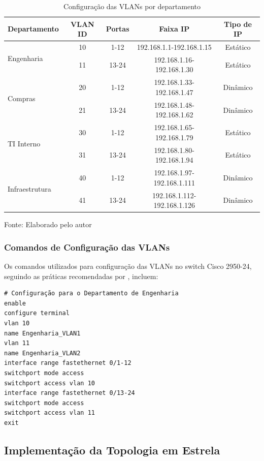 \begin{table}[H]
\centering
\caption{Configuração das VLANs por departamento}
\begin{tabular}{|l|c|c|c|c|}
\hline
\textbf{Departamento} & \textbf{VLAN ID} & \textbf{Portas} & \textbf{Faixa IP} & \textbf{Tipo de IP} \\
\hline
\multirow{2}{*}{Engenharia} & 10 & 1-12 & 192.168.1.1-192.168.1.15 & Estático \\
\cline{2-5}
& 11 & 13-24 & 192.168.1.16-192.168.1.30 & Estático \\
\hline
\multirow{2}{*}{Compras} & 20 & 1-12 & 192.168.1.33-192.168.1.47 & Dinâmico \\
\cline{2-5}
& 21 & 13-24 & 192.168.1.48-192.168.1.62 & Dinâmico \\
\hline
\multirow{2}{*}{TI Interno} & 30 & 1-12 & 192.168.1.65-192.168.1.79 & Estático \\
\cline{2-5}
& 31 & 13-24 & 192.168.1.80-192.168.1.94 & Estático \\
\hline
\multirow{2}{*}{Infraestrutura} & 40 & 1-12 & 192.168.1.97-192.168.1.111 & Dinâmico \\
\cline{2-5}
& 41 & 13-24 & 192.168.1.112-192.168.1.126 & Dinâmico \\
\hline
\end{tabular}

\label{tab:vlans_configuracao}
{\fontsize{10pt}{\baselineskip}\selectfont
Fonte: Elaborado pelo autor}
\end{table}

\subsubsection{Comandos de Configuração das VLANs}

Os comandos utilizados para configuração das VLANs no switch Cisco 2950-24, seguindo as práticas recomendadas por , incluem:

\begin{verbatim}
# Configuração para o Departamento de Engenharia
enable
configure terminal
vlan 10
name Engenharia_VLAN1
vlan 11
name Engenharia_VLAN2
interface range fastethernet 0/1-12
switchport mode access
switchport access vlan 10
interface range fastethernet 0/13-24
switchport mode access
switchport access vlan 11
exit
\end{verbatim}

\subsection{Implementação da Topologia em Estrela}

